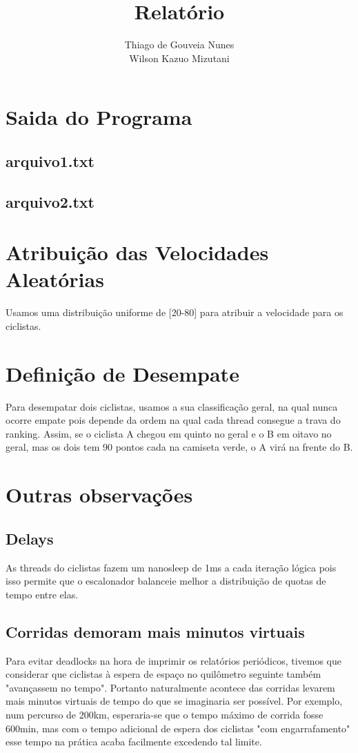\documentclass[a4paper,11pt]{article}
\title{Relatório}
\author{Thiago de Gouveia Nunes \\ Wilson Kazuo Mizutani}
\begin{document}
\maketitle
\tableofcontents

\clearpage
\section{Saida do Programa}
\subsection{arquivo1.txt}
\subsection{arquivo2.txt}
\section{Atribuição das Velocidades Aleatórias}
  Usamos uma distribuição uniforme de [20-80] para atribuir a velocidade para os ciclistas.
\section{Definição de Desempate}
  Para desempatar dois ciclistas, usamos a sua classificação geral, na qual nunca ocorre empate pois depende da ordem na qual cada thread
consegue a trava do ranking. Assim, se o ciclista A chegou em quinto no geral e o B em oitavo no geral, mas os dois tem 90 pontos
cada na camiseta verde, o A virá na frente do B.
\section{Outras observações}
\subsection{Delays}
  As threads do ciclistas fazem um nanosleep de 1ms a cada iteração lógica pois isso permite que o escalonador balanceie melhor a
distribuição de quotas de tempo entre elas.
\subsection{Corridas demoram mais minutos virtuais}
  Para evitar deadlocks na hora de imprimir os relatórios periódicos, tivemos que considerar que ciclistas à espera de espaço no
quilômetro seguinte também "avançassem no tempo". Portanto naturalmente acontece das corridas levarem mais minutos virtuais de tempo do
que se imaginaria ser possível. Por exemplo, num percurso de 200km, esperaria-se que o tempo máximo de corrida fosse 600min, mas com o
tempo adicional de espera dos ciclistas "com engarrafamento" esse tempo na prática acaba facilmente excedendo tal limite.
\end{document}
